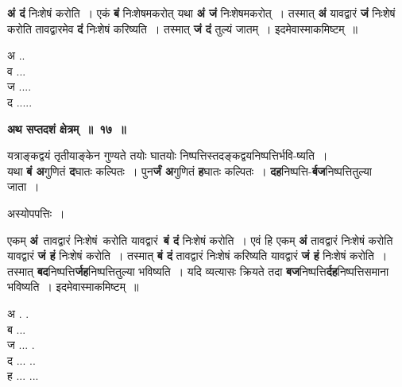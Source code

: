 \documentclass[11pt, openany]{book}
\begin{document}
\begin{flushleft}
\begin{minipage}[t]{0.74\textwidth}
\textbf{अं दं} निःशेषं करोति~। एकं \textbf{बं} निःशेषमकरोत् यथा \textbf{अं जं} निःशेषमकरोत्~। तस्मात् \textbf{अं} यावद्वारं \textbf{जं} निःशेषं करोति तावद्वारमेव \textbf{दं} निःशेषं करिष्यति~। तस्मात् \textbf{जं दं} तुल्यं जातम्~। इदमेवास्माकमिष्टम्~॥
\end{minipage} 
\hfill
\begin{minipage}[t]{0.15\textwidth}
अ .. \\
व ...\\
ज .... \\
द .....
\end{minipage}
\end{flushleft}
\vspace{-1mm}

\begin{center}
\textbf{\large अथ सप्तदशं क्षेत्रम्~॥~१७~॥}
\end{center}
 
 {\ab यत्राङ्कद्वयं तृतीयाङ्केन गुण्यते तयोः घातयोः निष्पत्तिस्तदङ्कद्वयनिष्पत्तिर्भवि-ष्यति~।} \\

 यथा \textbf{बं अ}गुणितं \textbf{द}घातः कल्पितः~। पुन\textbf{र्जं अ}गुणितं \textbf{ह}घातः कल्पितः~। \textbf{दह}निष्पत्ति-\textbf{र्बज}निष्पत्तितुल्या जाता~। 
 
\begin{center}
अस्योपपत्तिः~।
\end{center}

\begin{flushleft}
\begin{minipage}[t]{0.75\textwidth}
\hspace{4mm} एकम् \textbf{अं} \,तावद्वारं निःशेषं \,करोति यावद्वारं \,\textbf{बं दं} निःशेषं करोति~। एवं हि एकम् \textbf{अं} तावद्वारं निःशेषं करोति यावद्वारं \textbf{जं हं} निःशेषं करोति~। तस्मात् \textbf{बं दं} तावद्वारं निःशेषं करिष्यति यावद्वारं \textbf{जं हं} निःशेषं करोति~। तस्मात् \textbf{बद}निष्पत्ति\textbf{र्जह}निष्पत्तितुल्या भविष्यति~। यदि व्यत्यासः क्रियते तदा \textbf{बज}निष्पत्ति\textbf{र्दह}निष्पत्तिसमाना भविष्यति~। इदमेवास्माकमिष्टम्~॥ 
\end{minipage} 
\hfill
\begin{minipage}[t]{0.15\textwidth}
अ . .\\
ब ...\\
ज ... .\\
द ... ..\\
ह ... ...
\end{minipage}
\end{flushleft}
\vspace{-1mm}
\end{document}
